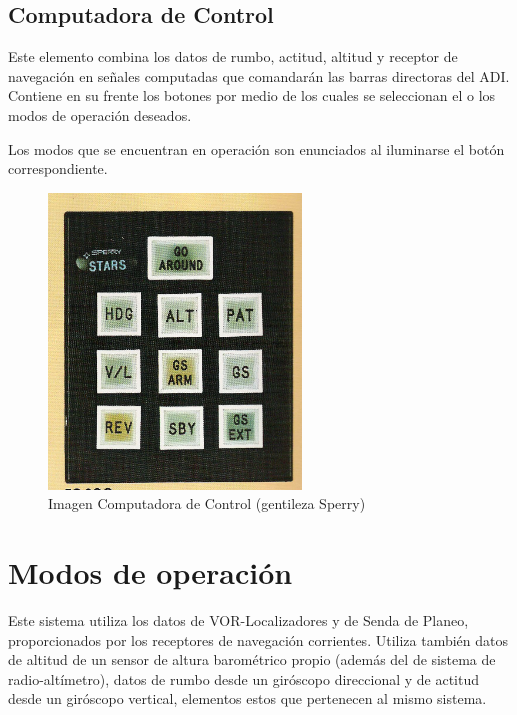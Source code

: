 \subsection{Computadora de Control}
\label{sec:control.computador}

Este elemento combina los datos de rumbo, actitud, altitud y receptor de 
navegaci\'on en se\~nales computadas que comandar\'an las barras
directoras del ADI.
Contiene en su frente los botones por medio de los cuales se
seleccionan el o los modos de operaci\'on deseados.

Los modos que se encuentran en operaci\'on son enunciados al iluminarse
el bot\'on correspondiente.


\begin{figure}[!h]
  \centering
  \includegraphics[width=0.6\textwidth]{07.directores.y.ctrol.automatico.vuelo/imagenes/computadora_sperry.png}  
  \caption{Imagen Computadora de Control (gentileza Sperry)}
  \label{fig:07.computadora.sperry}
\end{figure}

\section{Modos de operaci\'on}
\label{sec:modos.operacion}

Este sistema utiliza los datos de VOR-Localizadores y de Senda de Planeo,
proporcionados por los receptores de navegaci\'on corrientes.
Utiliza tambi\'en datos de altitud de un sensor de altura barom\'etrico
propio (adem\'as del de sistema de radio-alt\'imetro), datos de rumbo
desde un gir\'oscopo direccional y de actitud desde un gir\'oscopo
vertical, elementos estos que pertenecen al mismo sistema.


